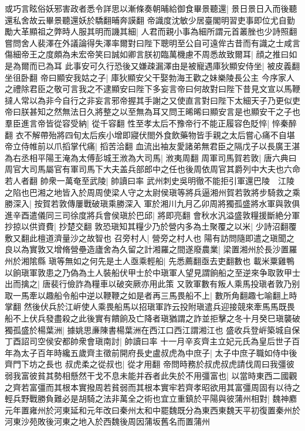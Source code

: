 或巧言眩俗妖邪害政者悉令詳思以漸條奏朝晡給御食畢景聽還|{
	景日景日入而後聽還私舍故云畢景聽還妖於驕翻晡奔謨翻}
帝識度沈敏少居臺閣明習吏事即位尤自勤勵大革顯祖之弊時人服其明而譏其細|{
	人君而親小事為細所謂元首叢脞也少詩照翻}
嘗問舍人裴澤在外議論得失澤率爾對曰陛下聰明至公自可遠侔古昔而有識之士咸言傷細帝王之度頗為未宏帝笑曰誠如卿言朕初臨萬機慮不周悉故致爾耳|{
	顔之推曰如是為爾而已為耳}
此事安可久行恐後又嫌疎漏澤由是被寵遇庫狄顯安侍坐|{
	被皮義翻坐徂卧翻}
帝曰顯安我姑之子|{
	庫狄顯安父干娶勃海王歡之妹樂陵長公主}
今序家人之禮除君臣之敬可言我之不逮顯安曰陛下多妄言帝曰何故對曰陛下昔見文宣以馬鞭撻人常以為非今自行之非妄言邪帝握其手謝之又使直言對曰陛下太細天子乃更似吏帝曰朕甚知之然無法日久將整之以至無為耳又問王晞晞曰顯安言是也顯安干之子也羣臣進言帝皆從容受納|{
	從千容翻}
性至孝太后不豫帝行不能正履容色貶悴|{
	悴秦醉翻}
衣不解帶殆將四旬太后疾小增即寢伏閤外食飲藥物皆手親之太后嘗心痛不自堪帝立侍帷前以爪搯掌代痛|{
	搯苦洽翻}
血流出袖友愛諸弟無君臣之隔戊子以長廣王湛為右丞相平陽王淹為太傅彭城王浟為大司馬|{
	浟夷周翻}
周軍司馬賀若敦|{
	唐六典曰周官大司馬屬官有軍司馬下大夫盖兵部郎中之任也後周依周官其爵列中大夫也六命若人者翻}
帥衆一萬奄至武陵|{
	帥讀曰率}
武州刺史吳明徹不能拒引軍還巴陵　江陵之陷也巴湘之地皆入於周周使梁人守之太尉侯瑱等將兵逼湘州賀若敦將步騎救之乘勝深入|{
	按賀若敦傳屢戰破瑱乘勝深入}
軍於湘川九月乙卯周將獨孤盛將水軍與敦俱進辛酉遣儀同三司徐度將兵會侯瑱於巴邱|{
	將即亮翻}
會秋水汎溢盛敦糧援斷絶分軍抄掠以供資費|{
	抄楚交翻}
敦恐瑱知其糧少乃於營内多為土聚覆之以米|{
	少詩沼翻覆敷又翻此檀道濟量沙之故智也}
召旁村人|{
	營旁之村人也}
陽有訪問隨即遣之瑱聞之良以為實敦又增脩營壘造廬舍為久留之計湘羅之間遂廢農業|{
	梁置湘州於長沙置羅州於湘隂縣}
瑱等無如之何先是土人亟乘輕船|{
	先悉薦翻亟去吏翻數也}
載米粟雞鴨以餉瑱軍敦患之乃偽為土人裝船伏甲士於中瑱軍人望見謂餉船之至逆來争取敦甲士出而擒之|{
	唐裴行儉詐為糧車以破突厥亦用此策}
又敦軍數有叛人乘馬投瑱者敦乃别取一馬牽以趣船令船中逆以鞭鞭之如是者再三馬畏船不上|{
	數所角翻趣七喻翻上時掌翻}
然後伏兵於江㟁使人乘畏船馬以招瑱軍詐云投附瑱遣兵迎接競來牽馬馬既畏船不上伏兵發盡殺之此後實有饋餉及亡降者瑱猶謂之詐並拒擊之冬十月癸巳瑱襲破獨孤盛於楊葉洲|{
	據姚思亷陳書楊葉洲在西江口西江謂湘江也}
盛收兵登㟁築城自保丁酉詔司空侯安都帥衆會瑱南討|{
	帥讀曰率}
十一月辛亥齊主立妃元氏為皇后世子百年為太子百年時纔五歲齊主徵前開府長史盧叔虎為中庶子|{
	太子中庶子職如侍中後齊門下坊之長也}
叔虎柔之從叔也|{
	從才用翻}
帝問時務於叔虎叔虎請伐周曰我彊彼弱我富彼貧其勢相懸然干戈不息未能并吞者此失於不用彊富也|{
	以當時東西二國觀之齊若富彊而其根本實撥周若貧弱而其根本實牢若齊孝昭欲用其富彊周固有以待之}
輕兵野戰勝負難必是胡騎之法非萬全之術也宜立重鎮於平陽與彼蒲州相對|{
	魏神䴥元年置雍州於河東延和元年改曰秦州太和中罷魏既分為東西東魏天平初復置秦州於河東沙苑敗後河東之地入於西魏後周因蒲坂舊名而置蒲州}
